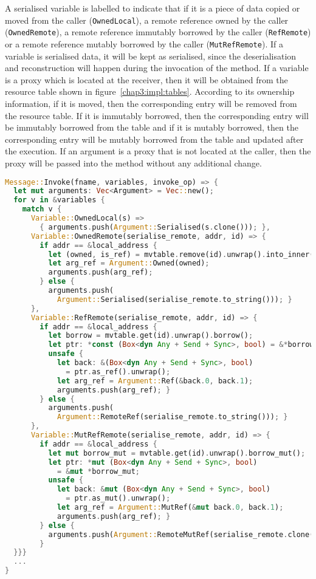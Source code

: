 A serialised variable is labelled to indicate that if it is a piece of data copied or moved from the caller (\texttt{OwnedLocal}), a remote reference owned by the caller (\texttt{OwnedRemote}), a remote reference immutably borrowed by the caller (\texttt{RefRemote}) or a remote reference mutably borrowed by the caller (\texttt{MutRefRemote}). 
If a variable is serialised data, it will be kept as serialised, since the deserialisation and reconstruction will happen during the invocation of the method. 
If a variable is a proxy which is located at the receiver, then it will be obtained from the resource table shown in figure~\ref{chap3:impl:tables}. According to its ownership information, if it is moved, then the corresponding entry will be removed from the resource table. 
If it is immutably borrowed, then the corresponding entry will be immutably borrowed from the table and if it is mutably borrowed, then the corresponding entry will be mutably borrowed from the table and updated after the execution. 
If an argument is a proxy that is not located at the caller, then the proxy will be passed into the method without any additional change.

\begin{lstlisting}[language=Rust, style=boxed, basicstyle=\footnotesize\ttfamily, caption={Gathering variables from an invocation message}, label=impl:invoke]
Message::Invoke(fname, variables, invoke_op) => {
  let mut arguments: Vec<Argument> = Vec::new();
  for v in &variables {
    match v {
      Variable::OwnedLocal(s) => 
        { arguments.push(Argument::Serialised(s.clone())); },
      Variable::OwnedRemote(serialise_remote, addr, id) => {
        if addr == &local_address {
          let (owned, is_ref) = mvtable.remove(id).unwrap().into_inner();
          let arg_ref = Argument::Owned(owned);
          arguments.push(arg_ref);
        } else { 
          arguments.push(
            Argument::Serialised(serialise_remote.to_string())); }
      },
      Variable::RefRemote(serialise_remote, addr, id) => {
        if addr == &local_address {
          let borrow = mvtable.get(id).unwrap().borrow();
          let ptr: *const (Box<dyn Any + Send + Sync>, bool) = &*borrow;
          unsafe {
            let back: &(Box<dyn Any + Send + Sync>, bool) 
              = ptr.as_ref().unwrap();
            let arg_ref = Argument::Ref(&back.0, back.1);
            arguments.push(arg_ref); }
        } else { 
          arguments.push(
            Argument::RemoteRef(serialise_remote.to_string())); }
      },
      Variable::MutRefRemote(serialise_remote, addr, id) => {
        if addr == &local_address {
          let mut borrow_mut = mvtable.get(id).unwrap().borrow_mut();
          let ptr: *mut (Box<dyn Any + Send + Sync>, bool)
            = &mut *borrow_mut;
          unsafe {
            let back: &mut (Box<dyn Any + Send + Sync>, bool) 
              = ptr.as_mut().unwrap();
            let arg_ref = Argument::MutRef(&mut back.0, back.1);
            arguments.push(arg_ref); }
        } else { 
          arguments.push(Argument::RemoteMutRef(serialise_remote.clone())); 
        }
  }}}
  ...
}
\end{lstlisting}

